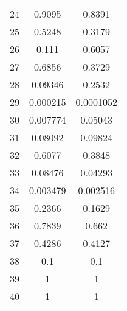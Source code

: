 \begin{table}[h!]
\begin{tabular}{||c|c|c||}
    24           & 0.9095              & 0.8391              \\
    25           & 0.5248              & 0.3179              \\
    26           & 0.111               & 0.6057              \\
    27           & 0.6856              & 0.3729              \\
    28           & 0.09346             & 0.2532              \\
    29           & 0.000215            & 0.0001052           \\
    30           & 0.007774            & 0.05043             \\
    31           & 0.08092             & 0.09824             \\
    32           & 0.6077              & 0.3848              \\
    33           & 0.08476             & 0.04293             \\
    34           & 0.003479            & 0.002516            \\
    35           & 0.2366              & 0.1629              \\
    36           & 0.7839              & 0.662               \\
    37           & 0.4286              & 0.4127              \\
    38           & 0.1                 & 0.1                 \\
    39           & 1                   & 1                   \\
    40           & 1                   & 1                   \\
    \bottomrule
  \end{tabular}
  \label{tab:stat_tests_5_vs_10}
\end{table}

